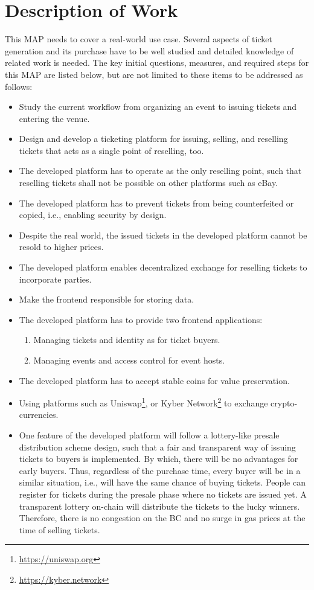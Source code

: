 \section{Description of Work}

This MAP needs to cover a real-world use case. Several aspects of ticket generation and its purchase have to be well studied and detailed knowledge of related work is needed. The key initial questions, measures, and required steps for this MAP are listed below, but are not limited to these items to be addressed as follows:

\begin{itemize}
    \item Study the current workflow from organizing an event to issuing tickets and entering the venue.
    \item Design and develop a ticketing platform for issuing, selling, and reselling tickets that acts as a single point of reselling, too.
    \item The developed platform has to operate as the only reselling point, such that reselling tickets shall not be possible on other platforms such as eBay.
    \item The developed platform has to prevent tickets from being counterfeited or copied, i.e., enabling security by design.
    \item Despite the real world, the issued tickets in the developed platform cannot be resold to higher prices.
    \item The developed platform enables decentralized exchange for reselling tickets to incorporate parties.
    \item Make the frontend responsible for storing data.
    \item The developed platform has to provide two frontend applications:
    \begin{enumerate}
        \item Managing tickets and identity as for ticket buyers.
        \item Managing events and access control for event hosts.
    \end{enumerate}
    \item The developed platform has to accept stable coins for value preservation.
    \item Using platforms such as Uniswap\footnote{\url{https://uniswap.org}}, or Kyber Network\footnote{\url{https://kyber.network}} to exchange crypto-currencies.
    \item One feature of the developed platform will follow a lottery-like presale distribution scheme design, such that a fair and transparent way of issuing tickets to buyers is implemented. By which, there will be no advantages for early buyers. Thus, regardless of the purchase time, every buyer will be in a similar situation, i.e., will have the same chance of buying tickets. People can register for tickets during the presale phase where no tickets are issued yet. A transparent lottery on-chain will distribute the tickets to the lucky winners. Therefore, there is no congestion on the BC and no surge in gas prices at the time of selling tickets.

\end{itemize}

